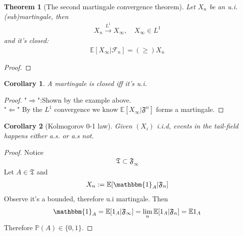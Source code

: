 \documentclass[a4paper,11pt]{book}
\newtheorem{theorem}{Theorem}[section]
\newtheorem{corollary}{Corollary}[theorem]
\theoremstyle{definition}
\theoremstyle{remark}
\begin{document}
\begin{theorem}[The second martingale convergence theorem]
	Let $X_n$ be an u.i. (sub)martingale, then 
	\begin{align*}
		X_n \overset{L^1}{\rightarrow} X_\infty, \quad X_\infty \in L^1
	\end{align*}
	and it's closed:
	\begin{align*}
		\mathbb{E}[X_\infty|\mathcal{F}_n] = (\geq) X_n
	\end{align*}
\end{theorem}
\begin{proof}
\end{proof}



\begin{corollary}
	A martingale is closed iff it's u.i.
\end{corollary}
\begin{proof}
	"$\Rightarrow$":Shown by the example above.\\
	"$\Leftarrow$" By the $L^1$ convergence we know $\mathbb{E}[X_\infty|\mathfrak{F}^n]$ forms a martingale. 
\end{proof}

\begin{corollary}[Kolmogorov 0-1 law]
 Given $(X_i)$ i.i.d, events in the tail-field happens either a.s. or a.s not.
\end{corollary}
\begin{proof}
	Notice
	\begin{align*}
		\mathfrak{T}\subset \mathfrak{F}_\infty
	\end{align*}
	Let $A \in \mathfrak{T}$ and 
	\begin{align*}
		X_n:= \mathbb{E}[\mathbbm{1}_A |\mathfrak{F}_n]
	\end{align*}
	Observe it's a bounded, therefore u.i martingale. Then
	\begin{align*}
		\mathbbm{1}_A = \mathbb{E}[1_A|\mathfrak{F}_\infty] 
		= \lim_n \mathbb{E}[1_A|\mathfrak{F}_n] = \mathbb{E}1_A
	\end{align*}
	Therefore $\mathbb{P}(A) \in \{0, 1\}$.
\end{proof}
\end{document}
